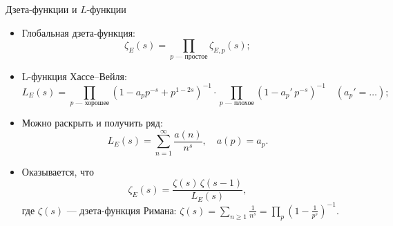 \documentclass[serif, aspectratio=169]{beamer}
\newcommand{\sagemark}{%
  \textcolor{green!40!black}{\textbf{\texttt{sage:...}}}%
}
\begin{document}
\begin{frame}{Дзета-функции и $L$-функции}
    \begin{itemize}
        \item Глобальная дзета-функция:
        \[\zeta_{E}(s) = \prod_{p\text{ --- простое}} \zeta_{E,p}(s);\]
        \item L-функция Хассе--Вейля: 
        \[L_E(s) = \prod_{p\text{ --- хорошее}}\left(1-a_p p^{-s}+p^{1-2s}\right)^{-1} \cdot \prod_{p\text{ --- плохое}} \left(1 - a_p'\,p^{-s}\right)^{-1}\quad (a_p'=\dots);\]
        \item Можно раскрыть и получить ряд:
        \[L_E(s) = \sum_{n=1}^{\infty} \frac{a(n)}{n^s},\quad a(p)=a_p.\]
        \item Оказывается, что
        \[\zeta_E(s) = \frac{\zeta(s)\,\zeta(s-1)}{L_E(s)},\]
        где $\zeta(s)$ --- дзета-функция Римана: $\zeta(s)=\sum_{n\geqslant 1} \frac{1}{n^s} = \prod_p (1-\frac{1}{p^s})^{-1}$.
    \end{itemize}
\end{frame}
\end{document}
